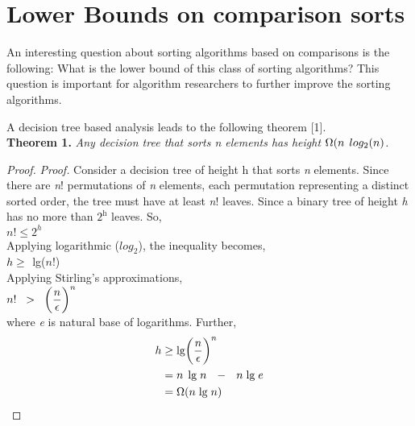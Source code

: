 \documentclass[a4paper, 10pt,twocolumn]{article}
\begin{document}
\section{Lower Bounds on comparison sorts}
An interesting question about sorting algorithms based on comparisons is the following: What is the lower bound of this class of sorting algorithms? This question is important for algorithm researchers to further improve the sorting algorithms.

A decision tree based analysis leads to the following theorem [1].\\

\textbf{Theorem 1.} \textit{Any decision tree that sorts n elements has height $\Omega(n\hspace{.15cm}log_{2}(n)$.}\\
\begin{proof}


\textit{Proof.} Consider a decision tree of height h that sorts \textit{n} elements. Since there are \textit{n}! permutations of \textit{n} elements, each permutation representing a distinct sorted order, the tree must have at least \textit{n}! leaves. Since a binary tree of height \textit{h} has no more than $2^{\textit{h}}$ leaves. So,\\

$\textit{n}! \leq 2^{h}$\\

Applying logarithmic ($log_{2}$), the inequality becomes,\\

$h \geq \hspace{.2cm}$lg($n!$) \\

Applying Stirling's approximations,\\

$n!\hspace{.2cm} >\hspace{.2cm}\bigg({\dfrac{n}{\epsilon}}\bigg)^{n}  $\\

where \textit{e} is natural base of logarithms. Further,\\

\begin{equation}
\begin{aligned}
h &\geq \textmd{lg} \bigg({\dfrac{n}{\epsilon}}\bigg)^{n} \\
& = n\hspace{.15cm}\textmd{lg}\hspace{.1cm}n\hspace{.25cm}-\hspace{.25cm}n\hspace{.1cm}\textmd{lg}\hspace{.1cm}e\\
& = \Omega(n\hspace{.1cm}\textmd{lg}\hspace{.1cm}n)
\end{aligned}
\end{equation}
\end{proof}
\end{document}
